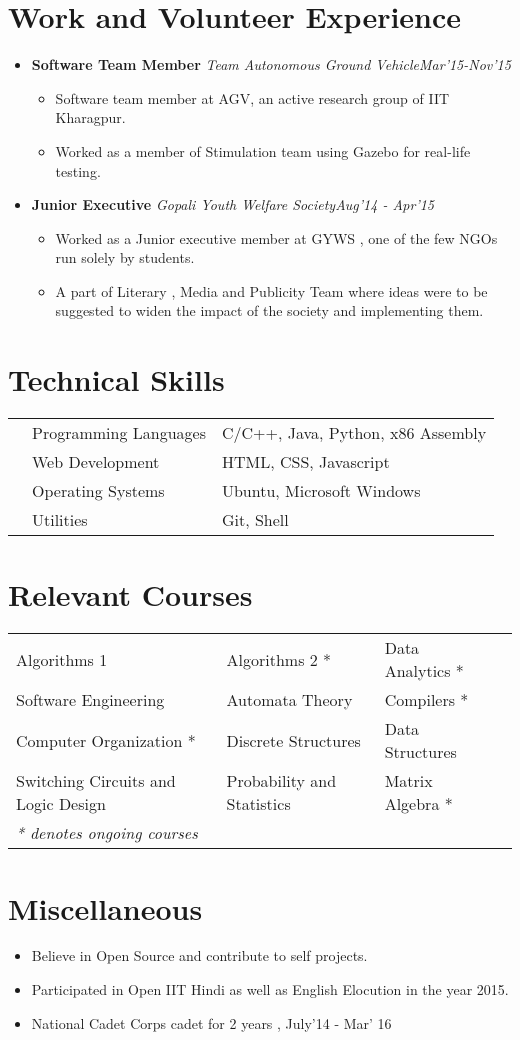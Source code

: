 \documentclass[11pt,a4paper]{moderncv}
\newcommand{\experience}[4]{
  \vspace{0.1cm}
\item \textbf{\large{#1}} \textit{#2}\hfill\textit{#3}
  \begin{itemize}[leftmargin=*]
    \setlength\itemsep{0em} #4
  \end{itemize}
}
\begin{document}
\section*{Work and Volunteer Experience}
\begin{itemize}
  \setlength\itemsep{0.5em}

  \experience{Software Team Member}{Team Autonomous Ground Vehicle}{Mar'15-Nov'15}{
  \item Software team member at AGV, an active research group of IIT Kharagpur.
  \item Worked as a member of Stimulation team using Gazebo for real-life testing.
  }
    
  \experience{Junior Executive}{Gopali Youth Welfare Society}{Aug'14 - Apr'15}{
  \item Worked as a Junior executive member at GYWS , one of the few NGOs run solely by students.
  \item A part of Literary , Media and Publicity Team where  ideas were to be suggested to widen the impact of the society and implementing them.
  }

\end{itemize}

\section*{Technical Skills}
\begin{tabular}{L{0.05cm} L{5cm} l}
  &Programming Languages      &C/C++, Java, Python, x86 Assembly\\
  &Web Development              &HTML, CSS, Javascript\\
  &Operating Systems          &Ubuntu, Microsoft Windows\\
  &Utilities                  &Git, Shell\\
\end{tabular}

\section*{Relevant Courses}
\begin{tabular}{L{7.2cm} L{6.0cm} L{5.6cm}l}
  Algorithms 1 & Algorithms 2 * &
  Data Analytics * \\  Software Engineering & Automata Theory &  Compilers * \\
  Computer Organization *  & Discrete Structures & Data Structures\\
  Switching Circuits and Logic Design &
  Probability and Statistics & Matrix Algebra *\\
  \textit{* denotes ongoing courses} \\
\end{tabular}

\section*{Miscellaneous}
\begin{itemize}
  \item Believe in Open Source and contribute to self projects.
  \item Participated in Open IIT Hindi as well as English Elocution in the year 2015.
  \item National Cadet Corps cadet for 2 years , July'14 - Mar' 16
\end{itemize}
\end{document}
